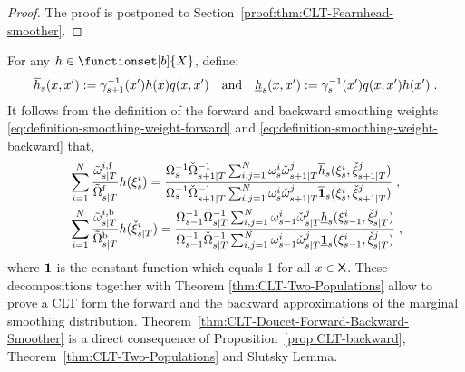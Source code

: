 \begin{proof}
The proof is postponed to Section~\ref{proof:thm:CLT-Fearnhead-smoother}.
\end{proof}
For any $h \in \functionset[b]{X}$, define:
\begin{equation}
\label{eq:barh}
\overline{h}_{s}(x,x'):= \gamma^{-1}_{s+1}(x') h(x) q(x,x')\quad\mbox{and}\quad\underline{h}_{s}(x,x'):= \gamma_s^{-1}(x') q(x,x') h(x')\;.
\end{equation}
It follows from the definition of the forward and backward smoothing weights \eqref{eq:definition-smoothing-weight-forward} and \eqref{eq:definition-smoothing-weight-backward} that,
\begin{align}
\label{eq:forward-approximation}
& \sum_{i=1}^N \frac{\smwght{s}{T}{i, \mathrm{f}}}{\tilde{\Omega}^{\mathrm{f}}_{s|T}} h(\epart{s}{i}) =
\frac{\sumwght{s}^{-1} \backsumwght{s+1}{T}^{-1} \sum_{i,j=1}^N \ewght{s}{i} \ebackwght{s+1}{T}{j} \fup{h}{s}(\epart{s}{i},\ebackpart{s+1}{T}{j}) }
{\sumwght{s}^{-1} \backsumwght{s+1}{T}^{-1} \sum_{i,j=1}^N \ewght{s}{i} \ebackwght{s+1}{T}{j}  \fup{\1}{s}(\epart{s}{i},\ebackpart{s+1}{T}{j}) } \eqsp, \\
\label{eq:backward-approximation}
& \sum_{i=1}^N \frac{\smwght{s}{T}{i, \mathrm{b}}}{\tilde{\Omega}^{\mathrm{b}}_{s|T}} h(\ebackpart{s}{T}{i})= \frac{\sumwght{s-1}^{-1} \backsumwght{s}{T}^{-1} \sum_{i,j=1}^N \ewght{s-1}{i} \ebackwght{s}{T}{j} \fdown{h}{s}(\epart{s-1}{i},\ebackpart{s}{T}{j})}{\sumwght{s-1}^{-1} \backsumwght{s}{T}^{-1} \sum_{i,j=1}^N \ewght{s-1}{i} \ebackwght{s}{T}{j}\fdown{\1}{s}(\epart{s-1}{i},\ebackpart{s}{T}{j})} \eqsp,
 \end{align}
 where $\mathbf{1}$ is the constant function which equals 1 for all $x\in\mathsf{X}$. These decompositions together with Theorem \ref{thm:CLT-Two-Populations} allow to prove a CLT form the forward and the backward approximations of the marginal smoothing distribution. Theorem~\ref{thm:CLT-Doucet-Forward-Backward-Smoother} is a direct consequence of Proposition~\ref{prop:CLT-backward}, Theorem~\ref{thm:CLT-Two-Populations} and Slutsky Lemma.
